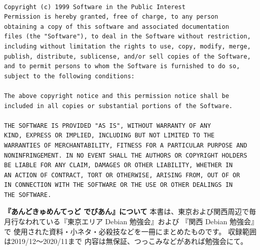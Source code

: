 \documentclass[mingoth,a4paper]{jsarticle}
\begin{document}
\begin{multicols}{2}
 \begin{fontsize}{6}{6}
 \begin{verbatim}

Copyright (c) 1999 Software in the Public Interest
Permission is hereby granted, free of charge, to any person
obtaining a copy of this software and associated documentation
files (the "Software"), to deal in the Software without restriction,
including without limitation the rights to use, copy, modify, merge,
publish, distribute, sublicense, and/or sell copies of the Software,
and to permit persons to whom the Software is furnished to do so,
subject to the following conditions:

The above copyright notice and this permission notice shall be
included in all copies or substantial portions of the Software.

THE SOFTWARE IS PROVIDED "AS IS", WITHOUT WARRANTY OF ANY
KIND, EXPRESS OR IMPLIED, INCLUDING BUT NOT LIMITED TO THE
WARRANTIES OF MERCHANTABILITY, FITNESS FOR A PARTICULAR PURPOSE AND
NONINFRINGEMENT. IN NO EVENT SHALL THE AUTHORS OR COPYRIGHT HOLDERS
BE LIABLE FOR ANY CLAIM, DAMAGES OR OTHER LIABILITY, WHETHER IN
AN ACTION OF CONTRACT, TORT OR OTHERWISE, ARISING FROM, OUT OF OR
IN CONNECTION WITH THE SOFTWARE OR THE USE OR OTHER DEALINGS IN
THE SOFTWARE.
 \end{verbatim}
 \end{fontsize}
\end{multicols}



\cleartooddpage

\newpage
\thispagestyle{empty}\mbox{}
\newpage

\thispagestyle{empty}
{
\large
\begin{itembox}{\bf 『あんどきゅめんてっど でびあん』について}
本書は、東京および関西周辺で毎月行なわれている『東京エリア Debian 勉強会』および
『関西 Debian 勉強会』で
使用された資料・小ネタ・必殺技などを一冊にまとめたものです。
収録範囲は2019/12〜2020/11まで
内容は無保証、つっこみなどがあれば勉強会にて。
\end{itembox}
}
\end{document}
